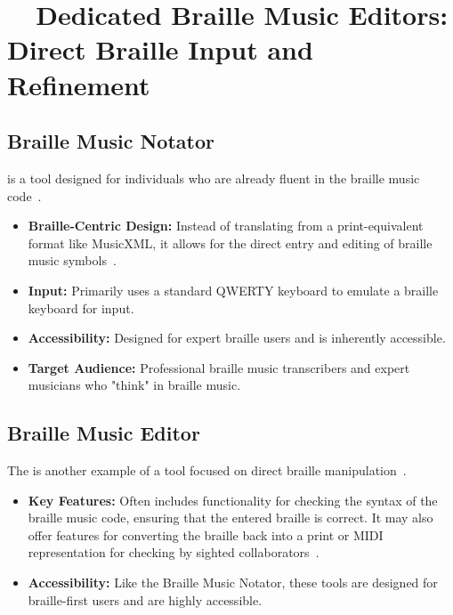 \section{~~Dedicated Braille Music Editors: Direct Braille Input and Refinement}\label{ch10:sec:dedicated-editors}

\subsection{Braille Music Notator}\label{ch10:ssec:braille-music-notator}
 is a tool designed for individuals who are already fluent in the braille music code~\supercite{braillemusicnotator, pathstoliteracy-notator, braillemusicnotator-quickstart}.
\begin{itemize}
	\item \textbf{Braille-Centric Design:} Instead of translating from a print-equivalent format like \gls{MusicXML}, it allows for the direct entry and editing of braille music symbols~\supercite{braillemusicnotator}.
	\item \textbf{Input:} Primarily uses a standard QWERTY keyboard to emulate a braille keyboard for input.
	\item \textbf{Accessibility:} Designed for expert braille users and is inherently accessible.
	\item \textbf{Target Audience:} Professional braille music transcribers and expert musicians who "think" in braille music.
\end{itemize}

\subsection{Braille Music Editor}\label{ch10:ssec:braille-music-editor}
The  is another example of a tool focused on direct braille manipulation~\supercite{braillemusiceditor}.
\begin{itemize}
	\item \textbf{Key Features:} Often includes functionality for checking the syntax of the braille music code, ensuring that the entered braille is correct. It may also offer features for converting the braille back into a print or MIDI representation for checking by sighted collaborators~\supercite{braillemusiceditor}.
	\item \textbf{Accessibility:} Like the Braille Music Notator, these tools are designed for braille-first users and are highly accessible.
\end{itemize}

